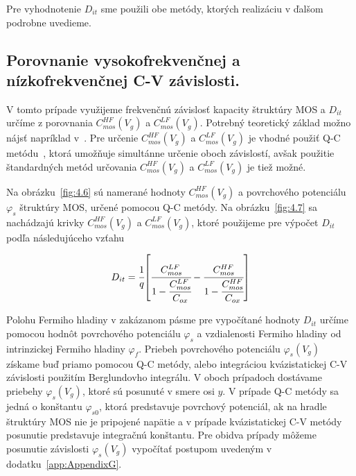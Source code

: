 Pre vyhodnotenie $D_{it}$ sme použili obe metódy, ktorých realizáciu v
ďalšom podrobne uvedieme.

\subsection{Porovnanie vysokofrekvenčnej a nízkofrekvenčnej C-V závislosti.}\label{sec:4.2.1}

V tomto prípade využijeme frekvenčnú závislosť kapacity štruktúry MOS
a $D_{it}$ určíme z porovnania $C_{mos}^{HF}(V_{g})$ a
$C_{mos}^{LF}(V_{g})$. Potrebný teoretický základ možno nájsť
napríklad v~\cite{I.1}.  Pre určenie $C_{mos}^{HF}(V_{g})$ a
$C_{mos}^{LF}(V_{g})$ je vhodné použiť Q-C metódu~\cite{3.4, 3.6, 3.7,
  3.8}, ktorá umožňuje simultánne určenie oboch závislostí, avšak
použitie štandardných metód určovania $C_{mos}^{HF}(V_{g})$ a
$C_{mos}^{LF}(V_{g})$ je tiež možné.

Na obrázku~\ref{fig:4.6} sú namerané hodnoty $C_{mos}^{HF}(V_{g})$ a
povrchového potenciálu $\varphi_{s}$ štruktúry MOS, určené pomocou Q-C
metódy. Na obrázku~\ref{fig:4.7} sa nachádzajú krivky
$C_{mos}^{HF}(V_{g})$ a $C_{mos}^{LF}(V_{g})$, ktoré použijeme pre
výpočet $D_{it}$ podľa následujúceho vzťahu~\cite{4.15}

\begin{equation}\label{eq:4.15}
  D_{it} = {\cfrac{1}{q}} {\left[\cfrac{C_{mos}^{LF}}{1-\cfrac{C_{mos}^{LF}}{C_{ox}}} - \cfrac{C_{mos}^{HF}}{1-\cfrac{C_{mos}^{HF}}{C_{ox}}}\right]}
\end{equation}

Polohu Fermiho hladiny v zakázanom pásme pre vypočítané hodnoty
$D_{it}$ určíme pomocou hodnôt povrchového potenciálu $\varphi_{s}$ a
vzdialenosti Fermiho hladiny od intrinzickej Fermiho hladiny
$\varphi_{f}$. Priebeh povrchového potenciálu $\varphi_{s}(V_{g})$
získame buď priamo pomocou Q-C metódy, alebo integráciou
kvázistatickej C-V závislosti použitím Berglundovho integrálu. V oboch
prípadoch dostávame priebehy $\varphi_{s}(V_{g})$, ktoré sú posunuté v
smere osi $y$. V prípade Q-C metódy sa jedná o konštantu
$\varphi_{s0}$, ktorá predstavuje povrchový potenciál, ak na hradle
štruktúry MOS nie je pripojené napätie a v prípade kvázistatickej C-V
metódy posunutie predstavuje integračnú konštantu. Pre obidva prípady
môžeme posunutie závislosti $\varphi_{s}(V_{g})$ vypočítať postupom
uvedeným v dodatku~\ref{app:AppendixG}.

